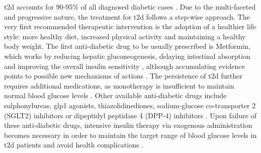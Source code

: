 \par \gls{t2d} accounts for 90-95\% of all diagnosed diabetic cases \textbf{\cite{home_idf_nodate,banday_pathophysiology_2020,elsayed_2_2022}}. Due to the multi-faceted and progressive nature, the treatment for \gls{t2d} follows a step-wise approach. The very first recommended therapeutic intervention is the adoption of a healthier life style: more healthy diet, increased physical activity and maintaining a healthy body weight. The first anti-diabetic drug to be usually prescribed is Metformin, which works by reducing hepatic gluconeogenesis, delaying intestinal absorption and improving the overall insulin sensitivity \textbf{\cite{kaneto_multifaceted_2021}}, although accumulating evidence points to possible new mechanisms of actions \textbf{\cite{foretz_metformin_2023}}. The persistence of \gls{t2d} further requires additional medications, as monotherapy is insufficient to maintain normal blood glucose levels \textbf{\cite{home_idf_nodate,nathan_medical_2009}}. Other available anti-diabetic drugs include sulphonylureas, \gls{glp1} agonists, thiazolidinediones, sodium-glucose co-transporter 2 (SGLT2) inhibitors or dipeptidyl peptidase 4 (DPP-4) inhibitors \textbf{\cite{home_idf_nodate,nathan_medical_2009,american_diabetes_association_8_2017}}. Upon failure of these anti-diabetic drugs, intensive insulin therapy via exogenous administration becomes necessary in order to maintain the target range of blood glucose levels in \gls{t2d} patients and avoid health complications \textbf{\cite{home_idf_nodate}}.




